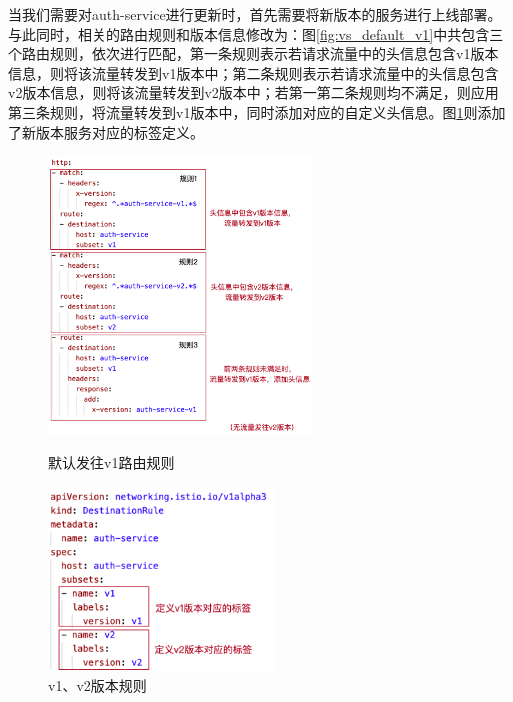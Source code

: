 \documentclass[a4paper]{article}
\theoremstyle{definition}
\begin{document}
当我们需要对auth-service进行更新时，首先需要将新版本的服务进行上线部署。与此同时，相关的路由规则和版本信息修改为：图\ref{fig:vs_default_v1}中共包含三个路由规则，依次进行匹配，第一条规则表示若请求流量中的头信息包含v1版本信息，则将该流量转发到v1版本中；第二条规则表示若请求流量中的头信息包含v2版本信息，则将该流量转发到v2版本中；若第一第二条规则均不满足，则应用第三条规则，将流量转发到v1版本中，同时添加对应的自定义头信息。图\ref{fig:dr_v1v2}则添加了新版本服务对应的标签定义。
\begin{figure}[!htbp]
\centering
\begin{minipage}[t]{0.48\textwidth}
\centering
\centerline{\includegraphics[width=7cm]{vs_default_v1.png}}
\caption{默认发往v1路由规则}
\label{fig:vs_default_v1}
\end{minipage}
\begin{minipage}[t]{0.48\textwidth}
\centering
\centerline{\includegraphics[width=6cm]{dr_v1v2.png}}
\caption{v1、v2版本规则}
\label{fig:dr_v1v2}
\end{minipage}
\end{figure}
\end{document}
